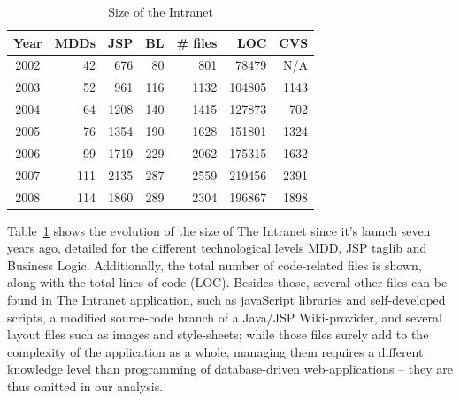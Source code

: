 \documentclass{acm_proc_article-sp}
\begin{document}
\begin{table}\label{tab:intranet-size}
	\centering
	\caption{Size of the Intranet}
	\begin{tabular}{c|r|r|r|r|r|r}
		\hline
		\hline
		Year	& MDDs	& JSP	& BL	& \# files	& LOC		& CVS	 \\
		\hline
		\hline
		2002 	& 42	& 676	& 80	& 801		& 78479 	& N/A	 \\ 
		\hline
		2003 	& 52	& 961	& 116	& 1132		& 104805 	& 1143	 \\ 
		\hline
		2004 	& 64	& 1208	& 140	& 1415		& 127873 	& 702	 \\ 
		\hline
		2005 	& 76	& 1354	& 190	& 1628		& 151801 	& 1324	 \\ 
		\hline
		2006 	& 99	& 1719	& 229	& 2062		& 175315 	& 1632	 \\ 
		\hline
		2007 	& 111	& 2135	& 287	& 2559		& 219456 	& 2391	 \\ 
		\hline
		2008 	& 114	& 1860	& 289	& 2304		& 196867 	& 1898	 \\ 
		\hline
		
		\hline
		\hline
	\end{tabular}
\end{table} 

Table~\ref{tab:intranet-size} shows the evolution of the size of The Intranet since it's launch seven years ago, detailed for the different technological levels MDD, JSP taglib and Business Logic. Additionally, the total number of code-related files is shown, along with the total lines of code (LOC). Besides those, several other files can be found in The Intranet application, such as javaScript libraries and self-developed scripts, a modified source-code branch of a Java/JSP Wiki-provider, and several layout files such as images and style-sheets; while those files surely add to the complexity of the application as a whole, managing them requires a different knowledge level than programming of database-driven web-applications -- they are thus omitted in our analysis.
\end{document}
